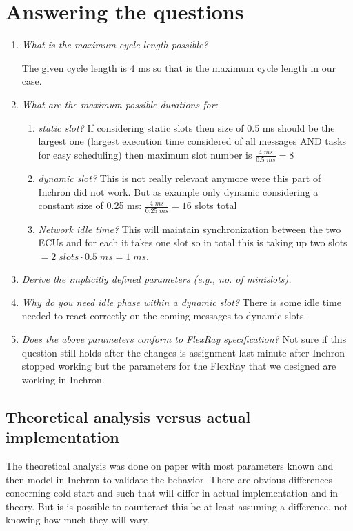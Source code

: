 \section{Answering the questions}


\begin{enumerate}
	\item \textit{What is the maximum cycle length possible? }
	
	The given cycle length is 4 ms so that is the maximum cycle length in our case.
	
	\item \textit{What are the maximum possible durations for:}
	
	\begin{enumerate}
			\item \textit{static slot?} If considering static slots then size of 0.5 ms should be the largest one (largest execution time considered of all messages AND tasks for easy scheduling) then maximum slot number is $\frac{4 \; ms}{0.5 \; ms} = 8$
			
			\item\textit{ dynamic slot? } This is not really relevant anymore were this part of Inchron did not work. But as example only dynamic considering a constant size of 0.25 ms: $\frac{4 \; ms}{0.25 \; ms} = 16 $ slots total
			
			\item \textit{Network idle time? }This will maintain synchronization between the two ECUs and for each it takes one slot so in total this is taking up two slots $= 2 \; slots \cdot 0.5 \; ms = 1 \; ms$.
	\end{enumerate}	
	
	\item\textit{ Derive the implicitly defined parameters (e.g., no. of minislots).}
	
	\item\textit{ Why do you need idle phase within a dynamic slot?} There is some idle time needed to react correctly on the coming messages to dynamic slots.
	
	\item \textit{Does the above parameters conform to FlexRay specification?} Not sure if this question still holds after the changes is assignment last minute after Inchron stopped working but the parameters for the FlexRay that we designed are working in Inchron. 
	
\end{enumerate}


\subsection{Theoretical analysis versus actual implementation}
The theoretical analysis was done on paper with most parameters known and then model in Inchron to validate the behavior. There are obvious differences concerning cold start and such that will differ in actual implementation and in theory. But is is possible to counteract this be at least assuming a difference, not knowing how much they will vary.


